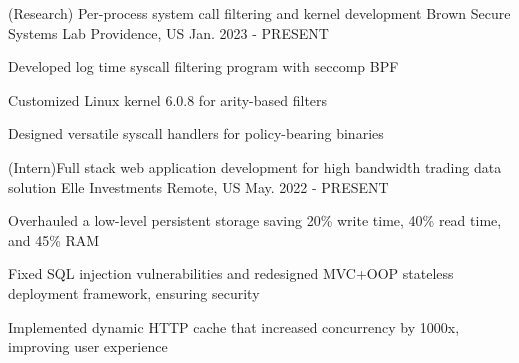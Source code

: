 \begin{cventries}
  \cventry
    {(Research) Per-process system call filtering and kernel development}
    {Brown Secure Systems Lab}
    {Providence, US}
    {Jan. 2023 - PRESENT}
    {
      \begin{cvitems}
        \item {Developed log time syscall filtering program with seccomp BPF}
        \item {Customized Linux kernel 6.0.8 for arity-based filters}
        \item {Designed versatile syscall handlers for policy-bearing binaries}      
      \end{cvitems}
    }

  \begin{comment}
  \cventry
    {Machine Learning \& Computation}
    {Chemical Molecular Energy Optimization}
    {Providence, RI}
    {Aug 2022 - Present}
    {
      \begin{cvitems}
        \item {Analyzed traditional Hartree-Fock and DFT methods with Gaussian}
        \item {Implemented the original data pipeline on Brown's Oscar super computing cluster with 200x speed}
        \item {Working on an efficient Belief Propagation network based on HMC}
      \end{cvitems}
    }
  \end{comment}
  \cventry
    {(Intern)Full stack web application development for high bandwidth trading data solution}
    {Elle Investments}
    {Remote, US}
    {May. 2022 - PRESENT}
    {
      \begin{cvitems}
        \item {Overhauled a low-level persistent storage saving 20\% write time, 40\% read time, and 45\% RAM}
        \item {Fixed SQL injection vulnerabilities and redesigned MVC+OOP stateless deployment framework, ensuring security}
        \item {Implemented dynamic HTTP cache that increased concurrency by 1000x, improving user experience}
      \end{cvitems}
    }


\end{cventries}
